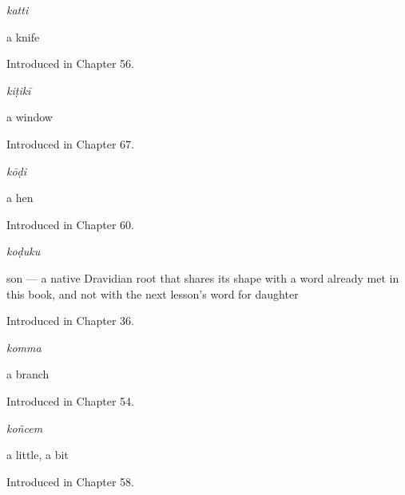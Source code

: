 \noindent\begin{minipage}[t]{\linewidth}
\raggedright
\textbf{}\enspace\emph{katti}\par
\small a knife\par
\footnotesize Introduced in Chapter 56.
\end{minipage}\par\medskip

\noindent\begin{minipage}[t]{\linewidth}
\raggedright
\textbf{}\enspace\emph{kiṭikī}\par
\small a window\par
\footnotesize Introduced in Chapter 67.
\end{minipage}\par\medskip

\noindent\begin{minipage}[t]{\linewidth}
\raggedright
\textbf{}\enspace\emph{kōḍi}\par
\small a hen\par
\footnotesize Introduced in Chapter 60.
\end{minipage}\par\medskip

\noindent\begin{minipage}[t]{\linewidth}
\raggedright
\textbf{}\enspace\emph{koḍuku}\par
\small son — a native Dravidian root that shares its shape with a word already met in this book, and not with the next lesson's word for daughter\par
\footnotesize Introduced in Chapter 36.
\end{minipage}\par\medskip

\noindent\begin{minipage}[t]{\linewidth}
\raggedright
\textbf{}\enspace\emph{komma}\par
\small a branch\par
\footnotesize Introduced in Chapter 54.
\end{minipage}\par\medskip

\noindent\begin{minipage}[t]{\linewidth}
\raggedright
\textbf{}\enspace\emph{koñcem}\par
\small a little, a bit\par
\footnotesize Introduced in Chapter 58.
\end{minipage}\par\medskip

